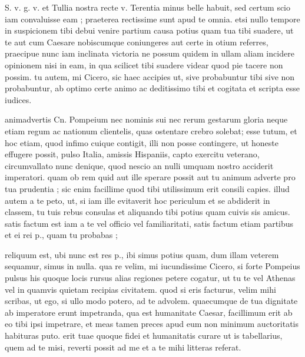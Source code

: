 


 S. v. g. v. et Tullia nostra recte v. Terentia minus belle habuit, sed certum scio iam convaluisse eam ; praeterea rectissime sunt apud te omnia. etsi nullo tempore in suspicionem tibi debui venire partium causa potius quam tua tibi suadere, ut te aut cum Caesare nobiscumque coniungeres aut certe in otium referres, praecipue nunc iam inclinata victoria ne possum quidem in ullam aliam incidere opinionem nisi in eam, in qua scilicet tibi suadere videar quod pie tacere non possim. tu autem, mi Cicero, sic haec accipies ut, sive probabuntur tibi sive non probabuntur, ab optimo certe animo ac deditissimo tibi et cogitata et scripta esse iudices.

 animadvertis Cn. Pompeium nec nominis sui nec rerum gestarum gloria neque etiam regum ac nationum clientelis, quas ostentare crebro solebat; esse tutum, et hoc etiam, quod infimo cuique contigit, illi non posse contingere, ut honeste effugere possit, pulso Italia, amissis Hispaniis, capto exercitu veterano, circumvallato nunc denique, quod nescio an nulli umquam nostro acciderit imperatori. quam ob rem quid aut ille sperare possit aut tu animum adverte pro tua prudentia ; sic enim facillime quod tibi utilissimum erit consili capies. illud autem a te peto, ut, si iam ille evitaverit hoc periculum et se abdiderit in classem, tu tuis rebus consulas et aliquando tibi potius quam cuivis sis amicus. satis factum est iam a te vel officio vel familiaritati, satis factum etiam partibus et ei rei p., quam tu probabas ;

 reliquum est, ubi nunc est res p., ibi simus potius quam, dum illam veterem sequamur, simus in nulla. qua re velim, mi iucundissime Cicero, si forte Pompeius pulsus his quoque locis rursus alias regiones petere cogatur, ut tu te vel Athenas vel in quamvis quietam recipias civitatem. quod si eris facturus, velim mihi scribas, ut ego, si ullo modo potero, ad te advolem. quaecumque de tua dignitate ab imperatore erunt impetranda, qua est humanitate Caesar, facillimum erit ab eo tibi ipsi impetrare, et meas tamen preces apud eum non minimum auctoritatis habituras puto. erit tuae quoque fidei et humanitatis curare ut is tabellarius, quem ad te misi, reverti possit ad me et a te mihi litteras referat.
